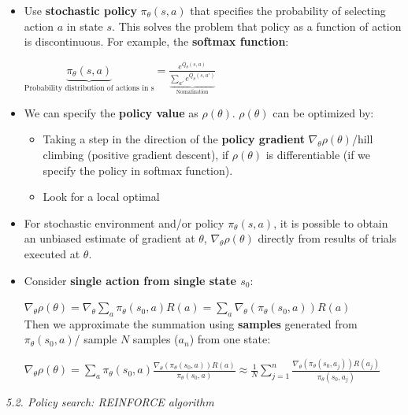 \documentclass[12pt]{article}
\begin{document}
\begin{itemize}
\item Use \textbf{stochastic policy} $\pi_\theta(s, a)$ that specifies the probability of selecting action $a$ in state $s$. This solves the problem that policy as a function of action is discontinuous. For example, the \textbf{softmax function}: 

$\underbrace{\pi_\theta (s, a)}_{\text{Probability distribution of actions in s}} = \frac{e^{\overline Q_\theta (s,a)}} { \underbrace{\sum_{a'}^{} e^{\overline Q_\theta (s,a')}}_{\text{Nomalization}} }$
 
 \item We can specify the \textbf{policy value} as $\rho (\theta)$. $\rho (\theta)$ can be optimized by:
 \begin{itemize}
 \item Taking a step in the direction of the \textbf{policy gradient} $\nabla_\theta \rho (\theta)$/hill climbing (positive gradient descent), if $\rho (\theta)$ is differentiable (if we specify the policy in softmax function).
 
 \item Look for a local optimal
 \end{itemize}
 
 \item For stochastic environment and/or policy $\pi_\theta (s,a)$, it is possible to obtain an unbiased estimate of gradient at $\theta$, $\nabla_\theta \rho (\theta)$ directly from results of trials executed at $\theta$.
 
 \item Consider \textbf{single action from single state $s_0$}:
 
  $\nabla_\theta \rho (\theta) = \nabla_\theta  \sum_{a}^{} \pi_\theta(s_0, a) R(a) = \sum_{a}^{} \nabla_\theta(\pi_\theta(s_0, a))R(a)$ \\
  
  Then we approximate the summation using \textbf{samples} generated from $\pi_\theta (s_0, a)$/ sample $N$ samples ($a_n$) from one state:  
 
 $\nabla_\theta \rho (\theta) = \sum_{a}^{} \pi_\theta(s_0, a) \frac{\nabla_\theta(\pi_\theta(s_0, a))R(a)}{\pi_\theta(s_0, a)} \approx \frac{1}{N} \sum_{j=1}^{n} \frac{\nabla_\theta(\pi_\theta(s_0, a_j))R(a_j)}{\pi_\theta(s_0, a_j)}$
 
\end{itemize}

\noindent
\textsl{5.2. Policy search: REINFORCE algorithm}\\
\end{document}
